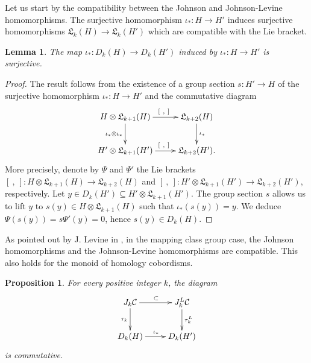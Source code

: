 \documentclass[10pt]{amsart}
\numberwithin{equation}{section}
\numberwithin{equation}{section}
\newtheorem{proposition}[theorem]{Proposition}
\newtheorem{lemma}[theorem]{Lemma}
\theoremstyle{definition}
\begin{document}
Let us start by the compatibility between the Johnson and Johnson-Levine homomorphisms. The surjective homomorphism $\iota_*:H\rightarrow H'$ induces surjective homomorphisms $\mathfrak{L}_{k}(H)\rightarrow \mathfrak{L}_{k}(H')$ which are compatible with the Lie bracket. 

\begin{lemma}\label{lema4.1} The  map $\iota_*:D_k(H)\rightarrow D_k(H')$ induced by $\iota_*:H\rightarrow H'$ is surjective.
\end{lemma}
\begin{proof} The result follows from the existence of a group section $s:H'\rightarrow H$ of the surjective homomorphism $\iota_*:H\rightarrow H'$ and the commutative diagram 
\begin{equation}\label{ecuacion4.1}%
\xymatrix{  H\otimes\mathfrak{L}_{k+1}(H)\ar[r]^{\ \ \left[\ ,\ \right]}\ar[d]_{\iota_*\otimes\iota_*} & \mathfrak{L}_{k+2}(H) \ar[d]^{\iota_*} \\
						H'\otimes\mathfrak{L}_{k+1}(H')\ar[r]^{\ \ \left[\ ,\ \right]} & \mathfrak{L}_{k+2}(H').}
\end{equation}
More precisely, denote by $\Psi$ and $\Psi'$ the Lie brackets $\left[\ ,\ \right]:H\otimes\mathfrak{L}_{k+1}(H)\rightarrow\mathfrak{L}_{k+2}(H)$ and $\left[\ ,\ \right]:H'\otimes\mathfrak{L}_{k+1}(H')\rightarrow\mathfrak{L}_{k+2}(H')$, respectively. Let $y\in D_k(H')\subseteq H'\otimes\mathfrak{L}_{k+1}(H')$. The group section $s$ allows us to lift $y$ to $s(y)\in H\otimes\mathfrak{L}_{k+1}(H)$ such that $\iota_*(s(y))=y$. We deduce  $\Psi(s(y))=s\Psi'(y)=0$, hence $s(y)\in D_k(H)$.
\end{proof}

As pointed out by J. Levine in \cite[Section 4]{MR2265877}, in the mapping class group case,  the Johnson homomorphisms and the Johnson-Levine homomorphisms are compatible. This also holds for the monoid of homology cobordisms.

\begin{proposition}\label{proposition1seccion4} For every positive integer $k$, the  diagram 
\begin{equation}\label{ecuacion4.2}%
\xymatrix{  J_k\mathcal{C}\ar[r]^{\subset}\ar[d]_{\tau_k} & J_k^L\mathcal{C} \ar[d]^{\tau_k^L} \\
						D_k(H)\ar[r]^{\iota_*} & D_k(H')}
\end{equation}
is commutative.
\end{proposition}
\end{document}
